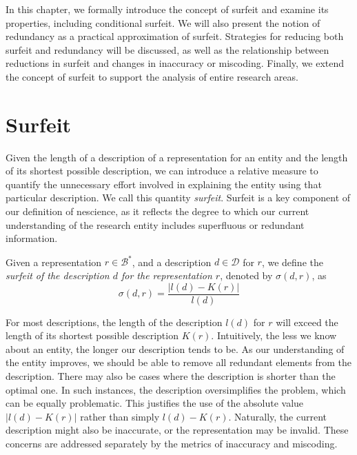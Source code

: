 In this chapter, we formally introduce the concept of surfeit and examine its properties, including conditional surfeit. We will also present the notion of redundancy as a practical approximation of surfeit. Strategies for reducing both surfeit and redundancy will be discussed, as well as the relationship between reductions in surfeit and changes in inaccuracy or miscoding. Finally, we extend the concept of surfeit to support the analysis of entire research areas.

%
%

\section{Surfeit}
\label{sec:Definition_surfeit}

Given the length of a description of a representation for an entity and the length of its shortest possible description, we can introduce a relative measure to quantify the unnecessary effort involved in explaining the entity using that particular description. We call this quantity \emph{surfeit}. Surfeit is a key component of our definition of nescience, as it reflects the degree to which our current understanding of the research entity includes superfluous or redundant information.

\begin{definition}[Surfeit]
Given a representation $r \in \mathcal{B}^\ast$, and a description $d \in \mathcal{D}$ for $r$, we define the \emph{surfeit of the description $d$ for the representation $r$}, denoted by $\sigma(d, r)$, as
\[
\sigma (d, r) = \frac{ | l(d) - K(r) |}{l(d)}
\]
\end{definition}

For most descriptions, the length of the description $l(d)$ for $r$ will exceed the length of its shortest possible description $K(r)$. Intuitively, the less we know about an entity, the longer our description tends to be. As our understanding of the entity improves, we should be able to remove all redundant elements from the description. There may also be cases where the description is shorter than the optimal one. In such instances, the description oversimplifies the problem, which can be equally problematic. This justifies the use of the absolute value $| l(d) - K(r) |$ rather than simply $l(d) - K(r)$. Naturally, the current description might also be inaccurate, or the representation may be invalid. These concerns are addressed separately by the metrics of inaccuracy and miscoding.

